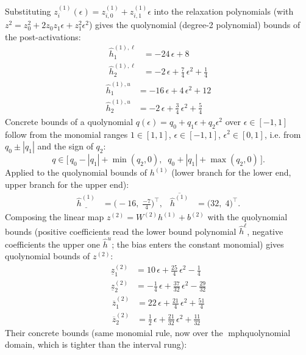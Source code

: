 \documentclass[11pt]{article}
\begin{document}
Substituting $z^{(1)}_i(\epsilon) = z^{(1)}_{i,0} + z^{(1)}_{i,1} \epsilon$ into the relaxation
polynomials (with $z^2 = z_0^2 + 2 z_0 z_1 \epsilon + z_1^2 \epsilon^2$) gives the quolynomial
(degree-2 polynomial) bounds of the post-activations:
\begin{align*}
\hat{h}^{(1),\ell}_{1} &= -24\,\epsilon + 8 \\
\hat{h}^{(1),\ell}_{2} &= -2\,\epsilon + \frac{7}{4}\,\epsilon^2 + \frac{1}{4}
\end{align*}
\begin{align*}
\hat{h}^{(1),u}_{1} &= -16\,\epsilon + 4\,\epsilon^2 + 12 \\
\hat{h}^{(1),u}_{2} &= -2\,\epsilon + \frac{3}{4}\,\epsilon^2 + \frac{5}{4}
\end{align*}
Concrete bounds of a quolynomial $q(\epsilon) = q_0 + q_1 \epsilon + q_2 \epsilon^2$ over
$\epsilon \in [-1, 1]$ follow from the monomial ranges $1 \in [1, 1]$, $\epsilon \in [-1, 1]$,
$\epsilon^2 \in [0, 1]$, i.e. from $q_0 \pm |q_1|$ and the sign of $q_2$:
\begin{equation*}
q \in \bigl[\, q_0 - |q_1| + \min(q_2, 0), \;\; q_0 + |q_1| + \max(q_2, 0) \,\bigr].
\end{equation*}
Applied to the quolynomial bounds of $h^{(1)}$ (lower branch for the lower end, upper branch for the upper end):
\begin{align*}
\underline{\hat{h}^{(1)}} &= \bigl(-16,\; \frac{-7}{4}\bigr)^{\!\top}, & \overline{\hat{h}^{(1)}} &= \bigl(32,\; 4\bigr)^{\!\top}.
\end{align*}
Composing the linear map $z^{(2)} = W^{(2)} h^{(1)} + b^{(2)}$ with the quolynomial bounds
(positive coefficients read the lower bound polynomial $\hat{h}^{\ell}$, negative coefficients the
upper one $\hat{h}^{u}$; the bias enters the constant monomial) gives quolynomial bounds of
$z^{(2)}$:
\begin{align*}
\underline{z}^{(2)}_{1} &= 10\,\epsilon + \frac{25}{4}\,\epsilon^2 - \frac{1}{4} \\
\underline{z}^{(2)}_{2} &= -\frac{1}{4}\,\epsilon + \frac{37}{32}\,\epsilon^2 - \frac{29}{32}
\end{align*}
\begin{align*}
\overline{z}^{(2)}_{1} &= 22\,\epsilon + \frac{21}{4}\,\epsilon^2 + \frac{51}{4} \\
\overline{z}^{(2)}_{2} &= \frac{1}{2}\,\epsilon + \frac{21}{32}\,\epsilon^2 + \frac{11}{32}
\end{align*}
Their concrete bounds (same monomial rule, now over the mph{quolynomial} domain, which is tighter than the interval rung):
\end{document}
